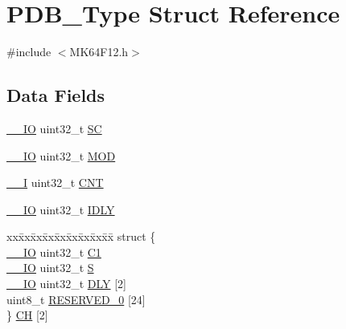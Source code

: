 \hypertarget{struct_p_d_b___type}{}\section{P\+D\+B\+\_\+\+Type Struct Reference}
\label{struct_p_d_b___type}


{\ttfamily \#include $<$M\+K64\+F12.\+h$>$}

\subsection*{Data Fields}
\begin{DoxyCompactItemize}
\item 
\mbox{\hyperlink{core__cm4_8h_aec43007d9998a0a0e01faede4133d6be}{\+\_\+\+\_\+\+IO}} uint32\+\_\+t \mbox{\hyperlink{group___v_r_e_f___peripheral___access___layer_ga71c139861c5c28b6a6e81b2b1c72946a}{SC}}
\item 
\mbox{\hyperlink{core__cm4_8h_aec43007d9998a0a0e01faede4133d6be}{\+\_\+\+\_\+\+IO}} uint32\+\_\+t \mbox{\hyperlink{group___v_r_e_f___peripheral___access___layer_gaa35a6713b1e2aafa0749f986730795cb}{M\+OD}}
\item 
\mbox{\hyperlink{core__cm4_8h_af63697ed9952cc71e1225efe205f6cd3}{\+\_\+\+\_\+I}} uint32\+\_\+t \mbox{\hyperlink{group___v_r_e_f___peripheral___access___layer_ga5a2def14363813fcf6287e3edd1104bf}{C\+NT}}
\item 
\mbox{\hyperlink{core__cm4_8h_aec43007d9998a0a0e01faede4133d6be}{\+\_\+\+\_\+\+IO}} uint32\+\_\+t \mbox{\hyperlink{group___v_r_e_f___peripheral___access___layer_ga84172a8f32e3e8ab454c186f973d63be}{I\+D\+LY}}
\item 
\begin{tabbing}
xx\=xx\=xx\=xx\=xx\=xx\=xx\=xx\=xx\=\kill
struct \{\\
\>\mbox{\hyperlink{core__cm4_8h_aec43007d9998a0a0e01faede4133d6be}{\_\_IO}} uint32\_t \mbox{\hyperlink{group___v_r_e_f___peripheral___access___layer_ga7bf92f3ccb47d979d85a1c09ca148024}{C1}}\\
\>\mbox{\hyperlink{core__cm4_8h_aec43007d9998a0a0e01faede4133d6be}{\_\_IO}} uint32\_t \mbox{\hyperlink{group___v_r_e_f___peripheral___access___layer_gababb54850c6689ddd1ac5723d7551f6a}{S}}\\
\>\mbox{\hyperlink{core__cm4_8h_aec43007d9998a0a0e01faede4133d6be}{\_\_IO}} uint32\_t \mbox{\hyperlink{group___v_r_e_f___peripheral___access___layer_ga826415186f68fa272f4659ba9af7c392}{DLY}} \mbox{[}2\mbox{]}\\
\>uint8\_t \mbox{\hyperlink{group___v_r_e_f___peripheral___access___layer_gaac9256575be36cd190e28da6992eb9b3}{RESERVED\_0}} \mbox{[}24\mbox{]}\\
\} \mbox{\hyperlink{group___v_r_e_f___peripheral___access___layer_ga09a3b25c72456dc274d97bd2c30e8c09}{CH}} \mbox{[}2\mbox{]}\\


\end{tabbing}
\end{DoxyCompactItemize}

